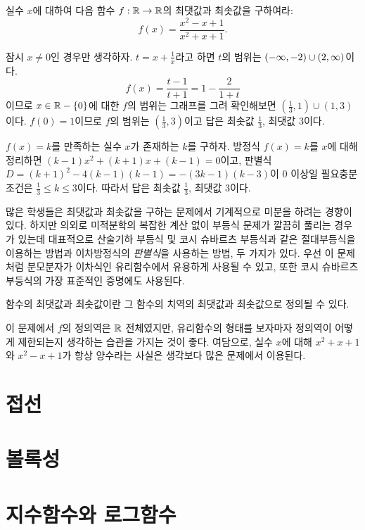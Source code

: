 \documentclass{../prb}
\begin{document}
\begin{prb}
실수 $x$에 대하여 다음 함수 $f:\R\to\R$의 최댓값과 최솟값을 구하여라:
\[f(x)=\frac{x^2-x+1}{x^2+x+1}.\]
\end{prb}
\begin{sol}[1]
잠시 $x\ne0$인 경우만 생각하자.
$t=x+\frac1x$라고 하면 $t$의 범위는 $(-\infty,-2)\cup(2,\infty)$이다.
\[f(x)=\frac{t-1}{t+1}=1-\frac2{1+t}\]이므로 $x\in\mathbb{R}-\{0\}$에 대한 $f$의 범위는 그래프를 그려 확인해보면 $\left(\tfrac13,1\right)\cup(1,3)$이다.
$f(0)=1$이므로 $f$의 범위는 $\left(\tfrac13,3\right)$이고 답은 최솟값 $\frac13$, 최댓값 3이다.
\end{sol}
\begin{sol}[2]
$f(x)=k$를 만족하는 실수 $x$가 존재하는 $k$를 구하자.
방정식 $f(x)=k$를 $x$에 대해 정리하면 $(k-1)x^2+(k+1)x+(k-1)=0$이고, 판별식 $D=(k+1)^2-4(k-1)(k-1)=-(3k-1)(k-3)$이 0 이상일 필요충분조건은 $\frac13\le k\le 3$이다.
따라서 답은 최솟값 $\frac13$, 최댓값 3이다.
\end{sol}
\begin{note}[1]
많은 학생들은 최댓값과 최솟값을 구하는 문제에서 기계적으로 미분을 하려는 경향이 있다.
하지만 의외로 미적분학의 복잡한 계산 없이 부등식 문제가 깔끔히 풀리는 경우가 있는데 대표적으로 산술기하 부등식 및 코시 슈바르츠 부등식과 같은 절대부등식을 이용하는 방법과 이차방정식의 \emph{판별식}을 사용하는 방법, 두 가지가 있다.
우선 이 문제처럼 분모분자가 이차식인 유리함수에서 유용하게 사용될 수 있고, 또한 코시 슈바르츠 부등식의 가장 표준적인 증명에도 사용된다.
\end{note}
\begin{note}[2]
함수의 최댓값과 최솟값이란 그 함수의 치역의 최댓값과 최솟값으로 정의될 수 있다.
\end{note}
\begin{note}[3]
이 문제에서 $f$의 정의역은 $\mathbb{R}$ 전체였지만, 유리함수의 형태를 보자마자 정의역이 어떻게 제한되는지 생각하는 습관을 가지는 것이 좋다.
여담으로, 실수 $x$에 대해 $x^2+x+1$와 $x^2-x+1$가 항상 양수라는 사실은 생각보다 많은 문제에서 이용된다.
\end{note}

\section{접선}

\section{볼록성}

\section{지수함수와 로그함수}
\end{document}
